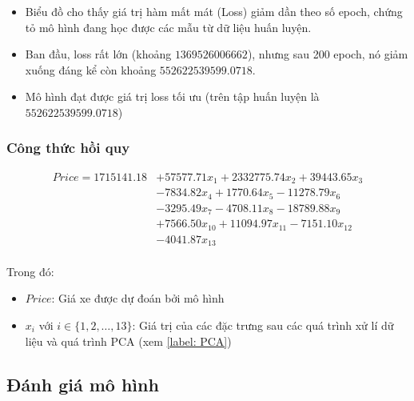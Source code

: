 \begin{itemize}
    \item Biểu đồ cho thấy giá trị hàm mất mát (Loss) giảm dần theo số epoch, chứng tỏ mô hình đang học được các mẫu từ dữ liệu huấn luyện.
    \item Ban đầu, loss rất lớn (khoảng $1369526006662$), nhưng sau 200 epoch, nó giảm xuống đáng kể còn khoảng $552622539599.0718$.
    \item Mô hình đạt được giá trị loss tối ưu (trên tập huấn luyện là $552622539599.0718$)
\end{itemize}
\subsubsection{Công thức hồi quy}
\[
\begin{aligned}
Price = 1715141.18 &+ 57577.71 x_1 + 2332775.74 x_2 + 39443.65 x_3 \\
              &- 7834.82 x_4 + 1770.64 x_5 - 11278.79 x_6 \\
              &- 3295.49 x_7 - 4708.11 x_8 - 18789.88 x_9 \\
              &+ 7566.50 x_{10} + 11094.97 x_{11} - 7151.10 x_{12} \\
              &- 4041.87 x_{13}
\end{aligned}
\]
\paragraph{}{Trong đó:}
\begin{itemize}
    \item $Price$: Giá xe được dự đoán bởi mô hình
    \item $x_i$ với $i \in \{1, 2, \dots, 13\}$: Giá trị của các đặc trưng sau các quá trình xử lí dữ liệu và quá trình PCA (xem \ref{label: PCA})
\end{itemize}
\subsection{Đánh giá mô hình}

